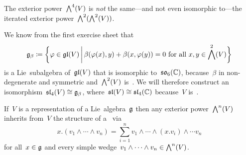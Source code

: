 \begin{warning}
  The exterior power~$\exterior[4]{V}$ is \emph{not} the same---and not even isomorphic to---the iterated exterior power~$\exterior[2]{\exterior[2]{V}}$.
\end{warning}

We know from the first exercise sheet that
\[
  \glie_\beta
  \defined
  \biggl\{
    \varphi
    \in
    \gllie(V)
    \suchthat[\bigg]
    \text{$\beta(\varphi(x), y) + \beta(x, \varphi(y)) = 0$ for all~$x,y \in \exterior[2]{V}$}
  \biggr\}
\]
is a Lie~subalgebra of~$\mathfrak{gl}(V)$ that is isomorphic to~$\mathfrak{so}_6(\mathbb{C})$, because~$\beta$ in non-degenerate and symmetric and~$\exterior[2]{V}$ is~.
We will therefore construct an isomorphism~$\mathfrak{sl}_4(V) \cong \mathfrak{g}_\beta$, where~$\mathfrak{sl}(V) \cong \mathfrak{sl}_4(\mathbb{C})$ because~$V$ is~.

\begin{lemma}
  \label{induced exterior action}
  If~$V$ is a representation of a Lie~algebra~$\glie$ then any exterior power~$\exterior[n]{V}$ inherits from~$V$ the structure of a~{\representation{$\glie$}} via
  \[
    x.(v_1 \wedge \dotsb \wedge v_n)
    =
    \sum_{i=1}^n v_1 \wedge \dotsb \wedge (x.v_i) \wedge \dotsb v_n
  \]
  for all~$x \in \mathfrak{g}$ and every simple wedge~$v_1 \wedge \dotsb \wedge v_n \in \exterior[n]{V}$.
\end{lemma}

